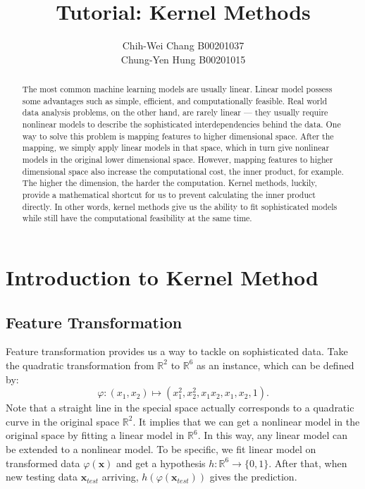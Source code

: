 \documentclass[12pt]{article}
\theoremstyle{definition}
\theoremstyle{remark}
\begin{document}

\title{Tutorial: Kernel Methods}
\author{Chih-Wei Chang B00201037\\
Chung-Yen Hung B00201015}
\maketitle

\begin{abstract}
  The most common machine learning models are usually linear. Linear model possess some advantages such as simple, efficient, and computationally feasible. Real world data analysis problems, on the other hand, are rarely linear --- they usually require nonlinear models to describe the sophisticated interdependencies behind the data. One way to solve this problem is mapping features to higher dimensional space. After the mapping, we simply apply linear models in that space, which in turn give nonlinear models in the original lower dimensional space. However, mapping features to higher dimensional space also increase the computational cost, the inner product, for example. The higher the dimension, the harder the computation. Kernel methods, luckily, provide a mathematical shortcut for us to prevent calculating the inner product directly. In other words, kernel methods give us the ability to fit sophisticated models while still have the computational feasibility at the same time.
\end{abstract}

\section{Introduction to Kernel Method}
\subsection{Feature Transformation}
Feature transformation provides us a way to tackle on sophisticated data. Take the quadratic transformation from \(\mathbb{R}^2\) to \(\mathbb{R}^6\) as an instance, which can be defined by:
\[
  \varphi: (x_1, x_2) \mapsto (x_1^2, x_2^2, x_1 x_2, x_1, x_2, 1).
\]
Note that a straight line in the special space actually corresponds to a quadratic curve in the original space \(\mathbb{R}^2\). It implies that we can get a nonlinear model in the original space by fitting a linear model in \(\mathbb{R}^6\). In this way, any linear model can be extended to a nonlinear model. To be specific, we fit linear model on transformed data \(\varphi(\mathbf{x})\) and get a hypothesis \(h: \mathbb{R}^6 \rightarrow \{0, 1\} \). After that, when new testing data \(\mathbf{x}_{test}\) arriving,  \(h(\varphi(\mathbf{x}_{test}))\) gives the prediction.
\end{document}
